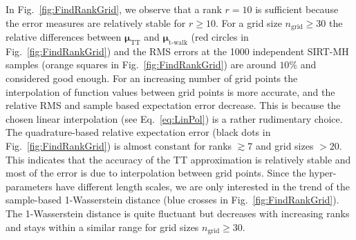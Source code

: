 In Fig.~\ref{fig:FindRankGrid}, we observe that a rank $r = 10$ is sufficient because the error measures are relatively stable for $r\geq10$.
For a grid size $n_{\text{grid}} \geq 30$ the relative differences between $\bm{\mu}_{\text{TT}}$ and $\bm{\mu}_{\text{t-walk}}$ (red circles in Fig.~\ref{fig:FindRankGrid}) and the RMS errors at the 1000 independent SIRT-MH samples (orange squares in Fig.~\ref{fig:FindRankGrid}) are around $ 10\%$ and considered good enough.
For an increasing number of grid points the interpolation of function values between grid points is more accurate, and the relative RMS and sample based expectation error decrease.
This is because the chosen linear interpolation (see Eq.~\ref{eq:LinPol}) is a rather rudimentary choice.
The quadrature-based relative expectation error (black dots in Fig.~\ref{fig:FindRankGrid}) is almost constant for ranks $ \gtrsim 7$ and grid sizes $ > 20$.
This indicates that the accuracy of the TT approximation is relatively stable and most of the error is due to interpolation between grid points.
Since the hyper-parameters have different length scales, we are only interested in the trend of the sample-based 1-Wasserstein distance (blue crosses in Fig.~\ref{fig:FindRankGrid}). 
The 1-Wasserstein distance is quite fluctuant but decreases with increasing ranks and stays within a similar range for grid sizes $n_{\text{grid}} \geq 30$.


